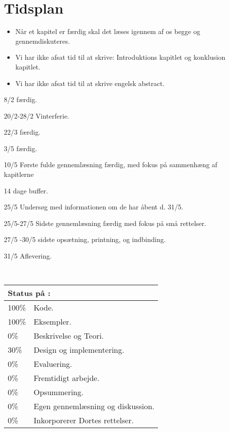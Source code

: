 \chapter{Tidsplan}

\begin{itemize}\tightlist
\item Når et kapitel er færdig skal det læses igennem af os begge og gennemdiskuteres.
\item Vi har ikke afsat tid til at skrive: Introduktions kapitlet og konklusion kapitlet.
\item Vi har ikke afsat tid til at skrive engelsk abstract.
\end{itemize}

\begin{list}{}{}
\tightlist 
\item [8/2] \des færdig.
\item [20/2-28/2] Vinterferie.
\item [22/3] \ds færdig.
\item [3/5] \is færdig.
\item [10/5] Første fulde gennemlæsning færdig, med fokus på sammenhæng af kapitlerne
\item [14 dage buffer.]
\item[25/5] Undersøg med informationen om de har åbent d. 31/5.
\item [25/5-27/5] Sidste gennemlæsning færdig med fokus på små rettelser.
\item [27/5 -30/5] sidste opsætning, printning, og indbinding.
\item [31/5] Aflevering. 
\end{list}\
\begin{tabular}{m{0.5cm}m{5cm}}
\hline  
\multicolumn{2}{m{4.5cm}}{\textbf{Status på \des:}} \\
\hline
100\% & Kode.  \\ 
100\% & Eksempler.\\
0\% & Beskrivelse og Teori.\\ %
30\% & Design og  implementering. \\ %
0\% & Evaluering. \\ %
0\% & Fremtidigt arbejde. \\ %
0\% & Opsummering. \\ %
0\% & Egen gennemlæsning og diskussion. \\ %
0\% & Inkorporerer Dortes rettelser. \\ %
\hline
\end{tabular}
